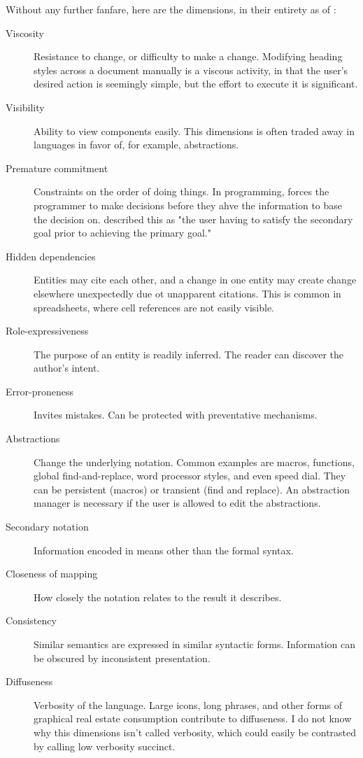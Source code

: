 Without any further fanfare, here are the dimensions, in their entirety as of \citeyear{blackwell-2003}:
\begin{description}
\item [Viscosity] Resistance to change, or difficulty to make a change. Modifying heading styles across a document manually is a viscous activity, in that the user's desired action is seemingly simple, but the effort to execute it is significant.
\item [Visibility] Ability to view components easily. This dimensions is often traded away in languages in favor of, for example, abstractions.
\item [Premature commitment] Constraints on the order of doing things. In programming, forces the programmer to make decisions before they ahve the information to base the decision on. \citet{roast-2000} described this as "the user having to satisfy the secondary goal prior to achieving the primary goal."
\item [Hidden dependencies] Entities may cite each other, and a change in one entity may create change elsewhere unexpectedly due ot unapparent citations. This is common in spreadsheets, where cell references are not easily visible.
\item [Role-expressiveness] The purpose of an entity is readily inferred. The reader can discover the author's intent. 
\item [Error-proneness] Invites mistakes. Can be protected with preventative mechanisms.  
\item [Abstractions] Change the underlying notation. Common examples are macros, functions, global find-and-replace, word processor styles, and even speed dial. They can be persistent (macros) or transient (find and replace). An abstraction manager is necessary if the user is allowed to edit the abstractions. 
\item [Secondary notation] Information encoded in means other than the formal syntax. 
\item [Closeness of mapping] How closely the notation relates to the result it describes. 
\item [Consistency] Similar semantics are expressed in similar syntactic forms. Information can be obscured by inconsistent presentation.
\item [Diffuseness] Verbosity of the language. Large icons, long phrases, and other forms of graphical real estate consumption contribute to diffuseness. I do not know why this dimensions isn't called verbosity, which could easily be contrasted by calling low verbosity succinct.

\end{description}
